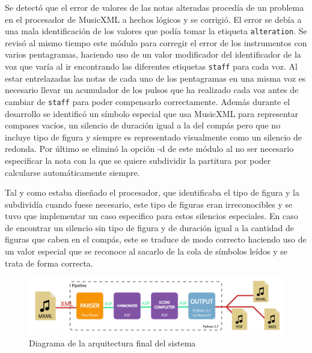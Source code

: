Se detectó que el error de valores de las notas alteradas procedía de un problema en el procesador de MusicXML a hechos lógicos y se corrigió. El error se debía a una mala identificación de los valores que podía tomar la etiqueta \texttt{alteration}. Se revisó al mismo tiempo este módulo para corregir el error de los instrumentos con varios pentagramas, haciendo uso de un valor modificador del identificador de la voz que varía al ir encontrando las diferentes etiquetas \texttt{staff} para cada voz. Al estar entrelazadas las notas de cada uno de los pentagramas en una misma voz es necesario llevar un acumulador de los pulsos que ha realizado cada voz antes de cambiar de \texttt{staff} para poder compensarlo correctamente. Además durante el desarrollo se identificó un símbolo especial que usa MusicXML para representar compases vacíos, un silencio de duración igual a la del compás pero que no incluye tipo de figura y siempre es representado visualmente como un silencio de redonda. Por último se eliminó la opción -d de este módulo al no ser necesario especificar la nota con la que se quiere subdividir la partitura por poder calcularse automáticamente siempre.

Tal y como estaba diseñado el procesador, que identificaba el tipo de figura y la subdividía cuando fuese necesario, este tipo de figuras eran irreconocibles y se tuvo que implementar un caso especifico para estos silencios especiales. En caso de encontrar un silencio sin tipo de figura y de duración igual a la cantidad de figuras que caben en el compás, este se traduce de modo correcto haciendo uso de un valor especial que se reconoce al sacarlo de la cola de símbolos leídos y se trata de forma correcta.

\begin{figure}
	\centering
	\includegraphics[width=0.8\linewidth]{imagenes/arquitectura_final.pdf}
	\caption{Diagrama de la arquitectura final del sistema}
	\label{fig:arquitectura_final}
\end{figure}

